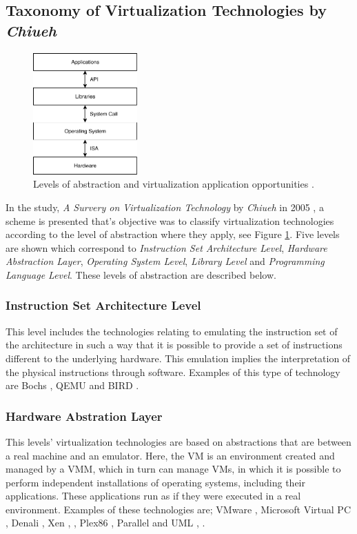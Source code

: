 	\subsection{Taxonomy of Virtualization Technologies by \textit{Chiueh}}
	\begin{figure}[H]
		\centering
		\includegraphics[width=4cm]{images/Chiueh2005.pdf}
		\vspace{-0.2cm}
		\caption{Levels of abstraction and virtualization application opportunities \cite{Chiueh2005}.}
		\label{fig:VirtualizationOpportunities}
	\end{figure}
	
	In the study, \textit{A Survery on Virtualization Technology} by \textit{Chiueh} in 2005 \cite{Chiueh2005}, a scheme is presented that's objective was to classify virtualization technologies according to the level of abstraction where they apply, see Figure \ref{fig:VirtualizationOpportunities}. Five levels are shown which correspond to \textit{Instruction Set Architecture Level}, \textit{Hardware Abstraction Layer}, \textit{Operating System Level}, \textit{Library Level} and \textit{Programming Language Level}. These levels of abstraction are described below.
	
	\subsubsection{Instruction Set Architecture Level} 
	This level includes the technologies relating to emulating the instruction set of the architecture in such a way that it is possible to provide a set of instructions different to the underlying hardware. This emulation implies the interpretation of the physical instructions through software. Examples of this type of technology are Bochs \cite{Bochs2018}, QEMU \cite {QEMU2018} and BIRD \cite {Nanda2006}.
	
	\subsubsection{Hardware Abstration Layer}
	This levels' virtualization technologies are based on abstractions that are between a real machine and an emulator. Here, the VM is an environment created and managed by a VMM, which in turn can manage VMs, in which it is possible to perform independent installations of operating systems, including their applications. These applications run as if they were executed in a real environment. Examples of these technologies are; VMware \cite{VMware2018Website}, Microsoft Virtual PC \cite{Honeycutt2003}, Denali \cite {Whitaker2002}, Xen \cite{Xen2018Website} \cite{Barham2003}, \cite{Xen2018WebsiteCambridge}, Plex86 \cite{Plex86}, Parallel \cite{Parallels2018} and UML \cite{Dike2006}, \cite{UML2006Website}. 
	
